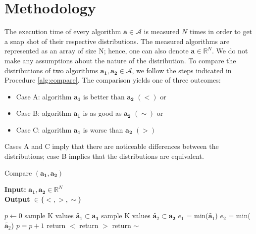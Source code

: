 \documentclass[conference]{IEEEtran}
\newcommand{\p}[1]{{\color{blue} Pdj: #1}}
\begin{document}
\section{Methodology}
\label{sec:met}

The execution time of every algorithm $\mathbf{a} \in \mathcal{A}$ is measured $N$ times in order to get a snap shot of their respective distributions. The measured algorithms are represented as an array of size N; hence, one can also denote $\mathbf{a} \in \mathbb{R}^N$.  We do not make any assumptions about the nature of the distribution. To compare the distributions of two algorithms $\mathbf{a_1},\mathbf{a_2} \in \mathcal{A}$, we follow the steps indicated in Procedure \ref{alg:compare}. 
%
The comparison yields one of three outcomes:
\begin{itemize}
	\item Case A: algorithm $\mathbf{a_1}$ is better than $\mathbf{a_2}$ $(<)$ or
	\item Case B: algorithm  $\mathbf{a_1}$ is as good as $\mathbf{a_2}$ $(\sim)$ or
	\item Case C: algorithm  $\mathbf{a_1}$ is worse than $\mathbf{a_2}$ $(>)$ 
\end{itemize}
Cases A and C imply that there are noticeable differences between the distributions; case B implies that the distributions are equivalent.
\begin{algorithm}
	\caption{Compare $(\mathbf{a_1}, \mathbf{a_2})$ }
	\label{alg:compare}
	\hspace*{\algorithmicindent} \textbf{Input: } $ \mathbf{a_1}, \mathbf{a_2} \in \mathbb{R}^{N}$ \\
	\hspace*{\algorithmicindent} \textbf{Output } $\in  \{<,>,\sim \}$
	\begin{algorithmic}[1] 
		\State $p \leftarrow 0$
		\State sample K values $\tilde{\mathbf{a}_1} \subset \mathbf{a_1}$
		\State sample K values $\tilde{\mathbf{a}_2} \subset \mathbf{a_2}$
		\State $e_1$ = min($\tilde{\mathbf{a}_1}$)
		\State $e_2$ = min($\tilde{\mathbf{a}_2}$)
		\State $p=p+1$
		\EndIf
		\EndFor
		\State return $<$ 
		\State return $>$ 
		\Else
		\State return $\sim$ 
		\EndIf
	\end{algorithmic}
\end{algorithm}
\end{document}
